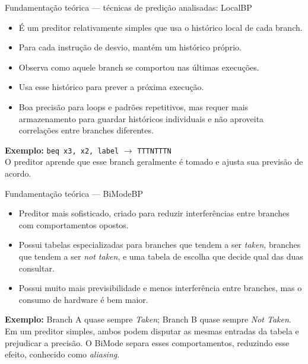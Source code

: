 \documentclass[aspectratio=169,11pt]{beamer}
\begin{document}
\begin{frame}{Fundamentação teórica --- técnicas de predição analisadas: LocalBP}
  \begin{itemize}
    \item É um preditor relativamente simples que usa o histórico local de
          cada branch.
    \item Para cada instrução de desvio, mantém um histórico próprio.
    \item Observa como aquele branch se comportou nas últimas execuções.
    \item Usa esse histórico para prever a próxima execução.
    \item Boa precisão para loops e padrões repetitivos, mas requer mais
          armazenamento para guardar históricos individuais e não aproveita
          correlações entre branches diferentes.
  \end{itemize}
  \vspace{4pt}
  \textbf{Exemplo:} \texttt{beq x3, x2, label} $\rightarrow$ \texttt{TTTNTTTN} \\
  O preditor aprende que esse branch geralmente é tomado e ajusta sua
  previsão de acordo.
\end{frame}

\begin{frame}{Fundamentação teórica --- BiModeBP}
  \begin{itemize}
    \item Preditor mais sofisticado, criado para reduzir interferências entre
          branches com comportamentos opostos.
    \item Possui tabelas especializadas para branches que tendem a ser
          \emph{taken}, branches que tendem a ser \emph{not taken}, e uma
          tabela de escolha que decide qual das duas consultar.
    \item Possui muito mais previsibilidade e menos interferência entre
          branches, mas o consumo de hardware é bem maior.
  \end{itemize}
  \vspace{4pt}
  \textbf{Exemplo:} Branch A quase sempre \emph{Taken}; Branch B quase sempre
  \emph{Not Taken}. Em um preditor simples, ambos podem disputar as mesmas
  entradas da tabela e prejudicar a precisão. O BiMode separa esses
  comportamentos, reduzindo esse efeito, conhecido como \emph{aliasing}.
\end{frame}

\end{document}
